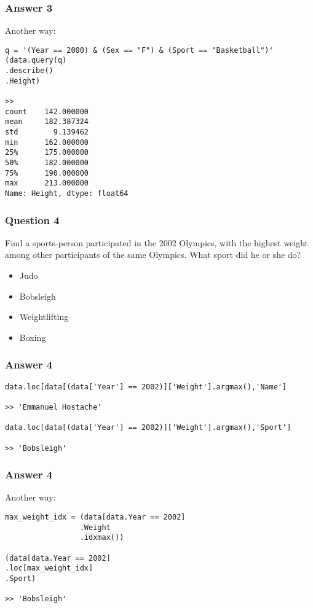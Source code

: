 \begin{frame}[fragile]\frametitle{Answer 3}
Another way:
\begin{lstlisting}
q = '(Year == 2000) & (Sex == "F") & (Sport == "Basketball")'
(data.query(q)
.describe()
.Height)

>> 
count    142.000000
mean     182.387324
std        9.139462
min      162.000000
25%      175.000000
50%      182.000000
75%      190.000000
max      213.000000
Name: Height, dtype: float64
\end{lstlisting}

\end{frame}

\begin{frame}[fragile]\frametitle{Question 4}	
Find a sports-person participated in the 2002 Olympics, with the highest weight among other participants of the same Olympics. What sport did he or she do?
\begin{itemize}
\item Judo
\item Bobsleigh
\item Weightlifting
\item Boxing
\end{itemize}

\end{frame}

\begin{frame}[fragile]\frametitle{Answer 4}
\begin{lstlisting}
data.loc[data[(data['Year'] == 2002)]['Weight'].argmax(),'Name']

>> 'Emmanuel Hostache'

data.loc[data[(data['Year'] == 2002)]['Weight'].argmax(),'Sport']

>> 'Bobsleigh'
\end{lstlisting}

\end{frame}

\begin{frame}[fragile]\frametitle{Answer 4}
Another way:
\begin{lstlisting}
max_weight_idx = (data[data.Year == 2002]
                 .Weight
                 .idxmax())

(data[data.Year == 2002]
.loc[max_weight_idx]
.Sport)

>> 'Bobsleigh'
\end{lstlisting}

\end{frame}


